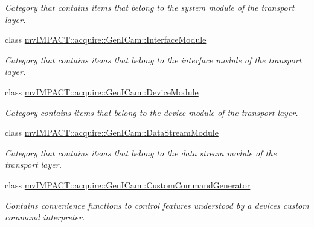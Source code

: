 \begin{DoxyCompactItemize}
\begin{DoxyCompactList}\small\item\em Category that contains items that belong to the system module of the transport layer. \end{DoxyCompactList}\item 
class \hyperlink{classmv_i_m_p_a_c_t_1_1acquire_1_1_gen_i_cam_1_1_interface_module}{mv\+I\+M\+P\+A\+C\+T\+::acquire\+::\+Gen\+I\+Cam\+::\+Interface\+Module}
\begin{DoxyCompactList}\small\item\em Category that contains items that belong to the interface module of the transport layer. \end{DoxyCompactList}\item 
class \hyperlink{classmv_i_m_p_a_c_t_1_1acquire_1_1_gen_i_cam_1_1_device_module}{mv\+I\+M\+P\+A\+C\+T\+::acquire\+::\+Gen\+I\+Cam\+::\+Device\+Module}
\begin{DoxyCompactList}\small\item\em Category contains items that belong to the device module of the transport layer. \end{DoxyCompactList}\item 
class \hyperlink{classmv_i_m_p_a_c_t_1_1acquire_1_1_gen_i_cam_1_1_data_stream_module}{mv\+I\+M\+P\+A\+C\+T\+::acquire\+::\+Gen\+I\+Cam\+::\+Data\+Stream\+Module}
\begin{DoxyCompactList}\small\item\em Category that contains items that belong to the data stream module of the transport layer. \end{DoxyCompactList}\item 
class \hyperlink{classmv_i_m_p_a_c_t_1_1acquire_1_1_gen_i_cam_1_1_custom_command_generator}{mv\+I\+M\+P\+A\+C\+T\+::acquire\+::\+Gen\+I\+Cam\+::\+Custom\+Command\+Generator}
\begin{DoxyCompactList}\small\item\em Contains convenience functions to control features understood by a devices custom command interpreter. \end{DoxyCompactList}\end{DoxyCompactItemize}
